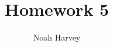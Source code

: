 \documentclass[a4paper,titlepage]{article}
\begin{document}
	\title{Homework 5}
	\author{Noah Harvey}
	\maketitle

	\pagebreak

	

\end{document}
